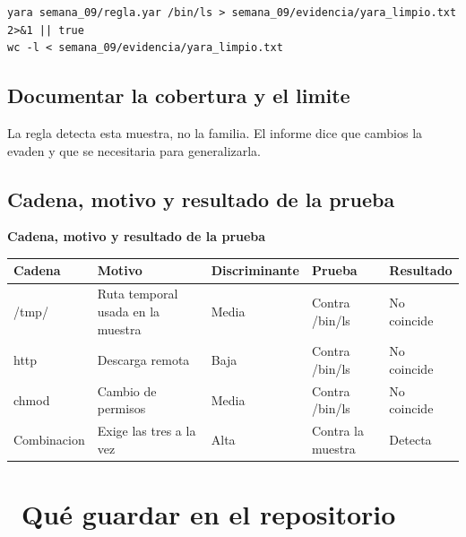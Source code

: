 \documentclass[11pt,a4paper]{article}
\newcommand{\iconotexto}[2]{\textcolor{cyanNeon}{\faIcon{#1}}~#2}
\begin{document}
\begin{lstlisting}[style=estiloCodigo]
yara semana_09/regla.yar /bin/ls > semana_09/evidencia/yara_limpio.txt 2>&1 || true
wc -l < semana_09/evidencia/yara_limpio.txt
\end{lstlisting}

\subsection{Documentar la cobertura y el limite}

La regla detecta esta muestra, no la familia. El informe dice que cambios la evaden y que se necesitaria para generalizarla.

\subsection{Cadena, motivo y resultado de la prueba}

\begin{center}
\begin{minipage}{\linewidth}
\centering
{\footnotesize
\textbf{Cadena, motivo y resultado de la prueba}\par\smallskip
\begin{tabular}{@{}>{\raggedright\arraybackslash}p{2.40cm}>{\raggedright\arraybackslash}p{3.20cm}>{\raggedright\arraybackslash}p{2.10cm}>{\raggedright\arraybackslash}p{2.90cm}>{\raggedright\arraybackslash}p{2.40cm}@{}}
\toprule
\textbf{Cadena} & \textbf{Motivo} & \textbf{Discriminante} & \textbf{Prueba} & \textbf{Resultado} \\
\midrule
/tmp/ & Ruta temporal usada en la muestra & Media & Contra /bin/ls & No coincide \\
http & Descarga remota & Baja & Contra /bin/ls & No coincide \\
chmod & Cambio de permisos & Media & Contra /bin/ls & No coincide \\
Combinacion & Exige las tres a la vez & Alta & Contra la muestra & Detecta \\
\bottomrule
\end{tabular}
}
\par{}
\end{minipage}
\end{center}

\section{\iconotexto{box-open}{Qué guardar en el repositorio}}
\end{document}
